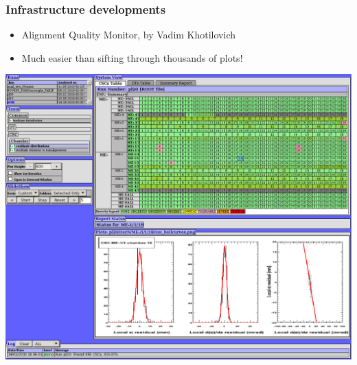 \documentclass[compress]{beamer}
\begin{document}
\begin{frame}
\frametitle{Infrastructure developments}

\begin{itemize}
\item Alignment Quality Monitor, by Vadim Khotilovich
\item Much easier than sifting through thousands of plots!
\end{itemize}

\begin{center}
\includegraphics[width=0.8\linewidth]{vadims_browser.png}
\end{center}
\end{frame}
\end{document}
